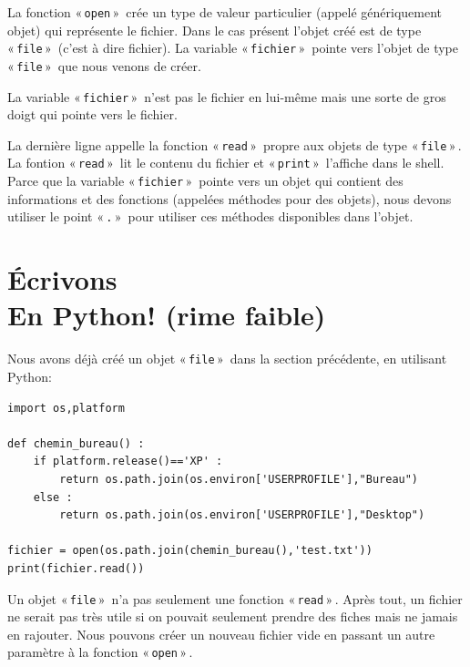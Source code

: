 La fonction « \texttt{open} »   crée un type de valeur particulier (appelé génériquement objet) qui représente le fichier. Dans le cas présent l'objet créé est de type « \texttt{file} »  (c'est à dire fichier). La variable « \texttt{fichier} »  pointe vers l'objet de type « \texttt{file} »  que nous venons de créer.

La variable « \texttt{fichier} »  n'est pas le fichier en lui-même mais une sorte de gros doigt qui pointe vers le fichier.

La dernière ligne appelle la fonction « \texttt{read} »  propre aux objets de type « \texttt{file} » . La fontion « \texttt{read} »  lit le contenu du fichier et « \texttt{print} »  l'affiche dans le shell. Parce que la variable « \texttt{fichier} »  pointe vers un objet qui contient des informations et des fonctions (appelées méthodes pour des objets), nous devons utiliser le point « \texttt{.} »   pour utiliser ces méthodes disponibles dans l'objet.

\begin{center}
\end{center}

\section{Écrivons\\
En Python! (rime faible)}

Nous avons déjà créé un objet « \texttt{file} »  dans la section précédente, en utilisant Python:

\begin{Verbatim}[frame=single,rulecolor=\color{gray}, label=ne pas saisir]
import os,platform

def chemin_bureau() :
    if platform.release()=='XP' :
        return os.path.join(os.environ['USERPROFILE'],"Bureau")
    else :
        return os.path.join(os.environ['USERPROFILE'],"Desktop")
    
fichier = open(os.path.join(chemin_bureau(),'test.txt'))
print(fichier.read())
\end{Verbatim}

Un objet « \texttt{file} »  n'a pas seulement une fonction « \texttt{read} » . Après tout, un fichier ne serait pas très utile si on pouvait seulement prendre des fiches mais ne jamais en rajouter. Nous pouvons créer un nouveau fichier vide en passant un autre paramètre à la fonction « \texttt{open} » .

